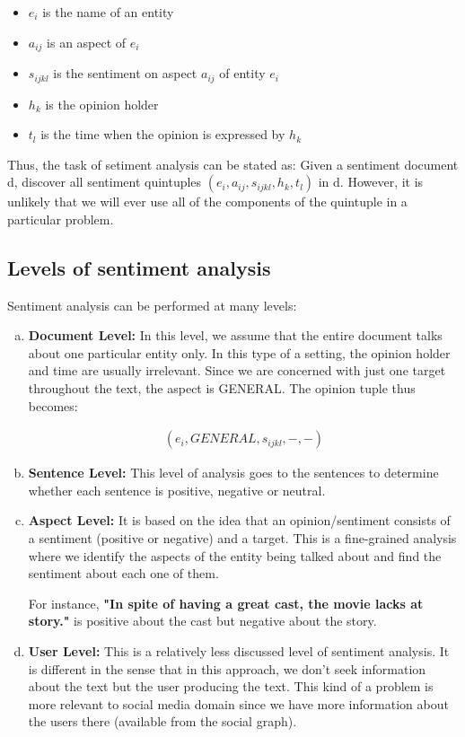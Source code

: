 \begin{itemize}
 \item $e_i$ is the name of an entity
 \item $a_{ij}$ is an aspect of $e_i$
 \item $s_{ijkl}$ is the sentiment on aspect $a_{ij}$ of entity $e_i$
 \item $h_k$ is the opinion holder
 \item $t_l$ is the time when the opinion is expressed by $h_k$
\end{itemize}

Thus, the task of setiment analysis can be stated as:
Given a sentiment document d, discover all sentiment quintuples $( e_i , a_{ij} , s_{ijkl} , h_k , t_l )$ in d. However, it is unlikely that we 
will ever use all of the components of the quintuple in a particular problem. \cite{book}

\subsection{Levels of sentiment analysis}

Sentiment analysis can be performed at many levels: 

\begin{enumerate}[(a)]%
\setlength{\itemsep}{15pt}
\item \textbf{Document Level: } In this level, we assume that the entire document talks about one particular entity only. 
In this type of a setting, the opinion holder and time are usually irrelevant. Since we are concerned with just one target throughout the text, the aspect is GENERAL.
The opinion tuple thus becomes: 

\begin{framed}
\begin{eqnarray}
 ( e_i , GENERAL , s_{ijkl} , - , - ) \nonumber
\end{eqnarray}
\end{framed}

\item \textbf{Sentence Level: } This level of analysis goes to the sentences to determine whether each sentence is positive, negative or neutral.
\item \textbf{Aspect Level: } It is based on the idea that an opinion/sentiment consists of a sentiment (positive or negative) and a target. This is a fine-grained 
analysis where we identify the aspects of the entity being talked about and find the sentiment about each one of them. 

For instance, 
\textbf{"In spite of having a great cast, the movie lacks at story."} is positive about the cast but negative about the story. 

\item \textbf{User Level: } This is a relatively less discussed level of sentiment analysis. It is different in the sense that in this approach, we don't seek information
about the text but the user producing the text. This kind of a problem is more relevant to social media domain since we have more information about the users there (available
from the social graph).
\end{enumerate} 

